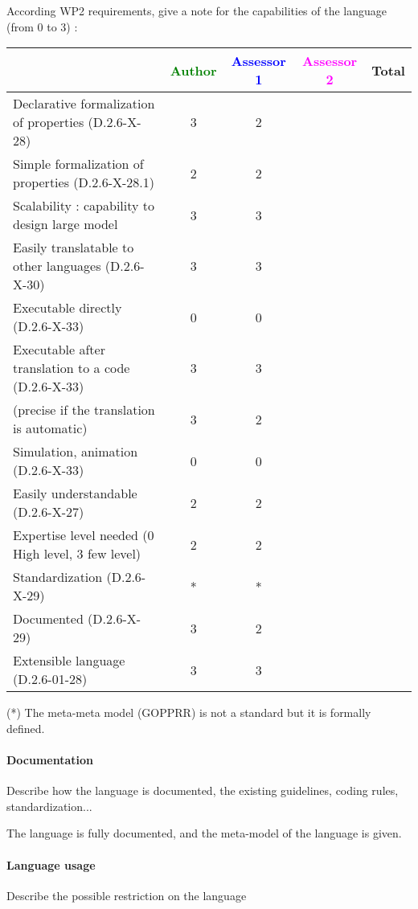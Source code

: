 According WP2 requirements, give a note for the capabilities of the language (from 0 to 3) :

\begin{tabular}{|l | c | c | c | c|}
  \hline
  & \textcolor{green}{Author} & \textcolor{blue}{Assessor 1} & \textcolor{magenta}{Assessor 2} & Total \\
  \hline
  Declarative formalization of properties (D.2.6-X-28) &3 &2 & & \\
  \hline
  Simple formalization of properties (D.2.6-X-28.1) &2 &2 & & \\
  \hline
  Scalability : capability to design large model &3 &3 & & \\
  \hline
  Easily translatable to other languages (D.2.6-X-30) &3 &3 & & \\
  \hline
  Executable directly (D.2.6-X-33) &0 &0 & & \\
  \hline
  Executable after translation to a code (D.2.6-X-33) &3 &3 & & \\
  (precise if the translation is automatic) &3 &2 & & \\
  \hline
  Simulation, animation (D.2.6-X-33) &0 &0 & & \\
  \hline
  Easily understandable (D.2.6-X-27) &2 &2 & & \\
  \hline
  Expertise level needed (0 High level, 3 few level) &2 &2 & & \\
  \hline
  Standardization (D.2.6-X-29) &* &* & & \\
  \hline
  Documented (D.2.6-X-29) &3 &2 & & \\
  \hline
  Extensible language (D.2.6-01-28) &3 &3 & & \\
  \hline
\end{tabular}

\begin{author_comment}
(*) The meta-meta model (GOPPRR) is not a standard but it is formally defined.
\end{author_comment}

\paragraph{Documentation} Describe how the language is documented, the existing guidelines, coding rules, standardization...

The language is fully documented, and the meta-model of the language
is given.
\paragraph{Language usage} Describe the possible restriction on the language


